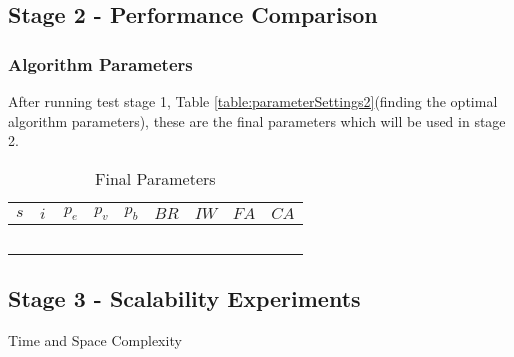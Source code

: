 \subsection{Stage 2 - Performance Comparison}

\subsubsection{Algorithm Parameters}
After running test stage 1, Table \ref{table:parameterSettings2}(finding the optimal algorithm parameters), these are the final parameters which will be used in stage 2.

\begin{table}[H]
	\centering
    \begin{tabular}{|l|l|l|l|l|l|l|l|l|}
 	\hline
 	$s$ & $i$ & $p_{e}$ & $p_{v}$ & $p_{b}$ & $BR$  & $IW$ & $FA$ & $CA$  \\
 	\hline
    ~ & ~ & ~ & ~ & ~ & ~ & ~ & ~  & ~  \\
	\hline
    \end{tabular}
    \caption {Final Parameters}
    \label{table:finalParameters}
	\end{table}

\subsection{Stage 3 -  Scalability Experiments}
Time and Space Complexity

